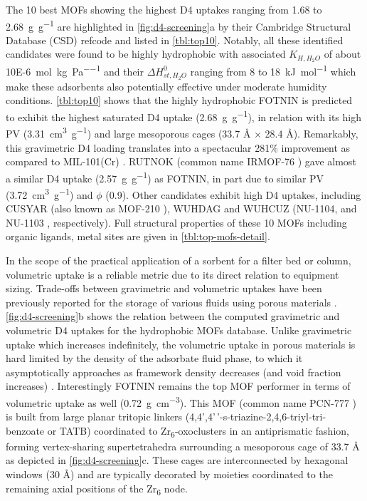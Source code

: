 The 10 best MOFs showing the highest D4 uptakes ranging from 1.68 to
\SI{2.68}{\gram\per\gram} are highlighted in \cref{fig:d4-screening}a by their
Cambridge Structural Database (CSD) \citep{allenCambridgeStructuralDatabase2002}
refcode and listed in \cref{tbl:top10}. Notably, all these identified candidates
were found to be highly hydrophobic with associated \(K_{H,H_{2}O}\) of about
\SI{10E-6}{\mol\per\kilo\gram\per\pascal} and their \(\Delta H_{st,H_{2}O}^{0}\)
ranging from 8 to \SI{18}{\kilo\joule\per\mol} which make these adsorbents also
potentially effective under moderate humidity conditions. \cref{tbl:top10} shows
that the highly hydrophobic FOTNIN is predicted to exhibit the highest saturated
D4 uptake (\SI{2.68}{\gram\per\gram}), in relation with its high PV
(\SI{3.31}{\centi\metre\cubed\per\gram}) and large mesoporous cages (33.7 Å ×
28.4 Å). Remarkably, this gravimetric D4 loading translates into a spectacular
281\% improvement as compared to MIL-101(Cr)
\citep{gargiuloChromiumbasedMIL101Metal2019}. RUTNOK (common name IRMOF-76
\citep{oisakiMetalOrganicFramework2010}) gave almost a similar D4 uptake
(\SI{2.57}{\gram\per\gram}) as FOTNIN, in part due to similar PV
(\SI{3.72}{\centi\metre\cubed\per\gram}) and \(\phi\) (0.9). Other candidates
exhibit high D4 uptakes, including CUSYAR (also known as MOF-210
\citep{furukawaUltrahighPorosityMetalOrganic2010}), WUHDAG and WUHCUZ (NU-1104,
and NU-1103 \citep{wangUltrahighSurfaceArea2015}, respectively). Full structural
properties of these 10 MOFs including organic ligands, metal sites are given in
\cref{tbl:top-mofs-detail}.

In the scope of the practical application of a sorbent for a filter bed or
column, volumetric uptake is a reliable metric due to its direct relation to
equipment sizing. Trade-offs between gravimetric and volumetric uptakes have
been previously reported for the storage of various fluids using porous
materials \citep{moghadamComputeraidedDiscoveryMetal2018}.
\cref{fig:d4-screening}b shows the relation between the computed gravimetric and
volumetric D4 uptakes for the hydrophobic MOFs database. Unlike gravimetric
uptake which increases indefinitely, the volumetric uptake in porous materials
is hard limited by the density of the adsorbate fluid phase, to which it
asymptotically approaches as framework density decreases (and void fraction
increases) \citep{bobbittHighthroughputScreeningMetal2016}. Interestingly FOTNIN
remains the top MOF performer in terms of volumetric uptake as well
(\SI{0.72}{\gram\per\centi\metre\cubed}). This MOF (common name PCN-777
\citep{fengHighlyStableZeotype2015}) is built from large planar tritopic linkers
(4,4',4'\,'-s-triazine-2,4,6-triyl-tri-benzoate or TATB) coordinated to
Zr\textsubscript{6}-oxoclusters in an antiprismatic fashion, forming
vertex-sharing supertetrahedra surrounding a mesoporous cage of 33.7 Å as
depicted in \cref{fig:d4-screening}c. These cages are interconnected by
hexagonal windows (30 Å) and are typically decorated by  moieties
coordinated to the remaining axial positions of the Zr\textsubscript{6} node.

